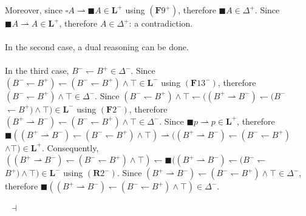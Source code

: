 \documentclass[draft]{article}
\newenvironment{proof}{{\bf Proof:}}{~$\dashv$\\}
\def\Formula{\mathbf{A}}
\def\Formula{\mathbf{F}}
\def\Rule{\mathbf{R}}
\def\L{\mathbf{L}}
\begin{document}
\begin{proof}
Moreover, since ${\square}A{\rightharpoonup}{\blacksquare}A{\in}\L^{+}$ using $(\Formula9^{+})$, therefore ${\blacksquare}A{\in}\Delta^{+}$.
Since ${\blacksquare}A{\rightharpoonup}A{\in}\L^{+}$, therefore $A{\in}\Delta^{+}$: a contradiction.
%
%
\\
\\
%
%
In the second case, a dual reasoning can be done.
%
%
\\
\\
%
%
In the third case, $B^{-}{\leftharpoondown}B^{+}{\in}\Delta^{-}$.
Since $(B^{-}{\leftharpoondown}B^{+}){\leftharpoondown}(B^{-}{\leftharpoondown}B^{+}){\wedge}{\top}{\in}\L^{-}$ using
%
%
%
%
%
%
%
\linebreak$
%
%
%
%
%
%
(\Formula13^{-})$, therefore $(B^{-}{\leftharpoondown}B^{+}){\wedge}{\top}{\in}\Delta^{-}$.
Since $(B^{-}{\leftharpoondown}B^{+}){\wedge}{\top}{\leftharpoondown}((B^{+}{\rightharpoonup}B^{-}){\leftharpoondown}(B^{-}
%
%
%
%
%
%
%
$\linebreak$
%
%
%
%
%
%
{\leftharpoondown}B^{+}){\wedge}{\top}){\in}\L^{-}$ using $(\Formula2^{-})$, therefore $(B^{+}{\rightharpoonup}B^{-}){\leftharpoondown}(B^{-}{\leftharpoondown}B^{+}){\wedge}{\top}{\in}\Delta^{-}$.
Since ${\blacksquare}p{\rightharpoonup}p{\in}\L^{+}$, therefore ${\blacksquare}((B^{+}{\rightharpoonup}B^{-}){\leftharpoondown}(B^{-}{\leftharpoondown}B^{+}){\wedge}{\top}){\rightharpoonup}((B^{+}{\rightharpoonup}B^{-}){\leftharpoondown}(B^{-}{\leftharpoondown}B^{+})
%
%
%
%
%
%
%
$\linebreak$
%
%
%
%
%
%
{\wedge}{\top}){\in}\L^{+}$.
Consequently, $((B^{+}{\rightharpoonup}B^{-}){\leftharpoondown}(B^{-}{\leftharpoondown}B^{+}){\wedge}{\top}){\leftharpoondown}{\blacksquare}((B^{+}{\rightharpoonup}B^{-}){\leftharpoondown}(B^{-}{\leftharpoondown}
%
%
%
%
%
%
%
$\linebreak$
%
%
%
%
%
%
B^{+}){\wedge}{\top}){\in}\L^{-}$ using $(\Rule2^{-})$.
Since $(B^{+}{\rightharpoonup}B^{-}){\leftharpoondown}(B^{-}{\leftharpoondown}B^{+}){\wedge}{\top}{\in}\Delta^{-}$, therefore
%
%
%
%
%
%
%
\linebreak$
%
%
%
%
%
%
{\blacksquare}((B^{+}{\rightharpoonup}B^{-}){\leftharpoondown}(B^{-}{\leftharpoondown}B^{+}){\wedge}{\top}){\in}\Delta^{-}$.

\end{proof}
\end{document}
